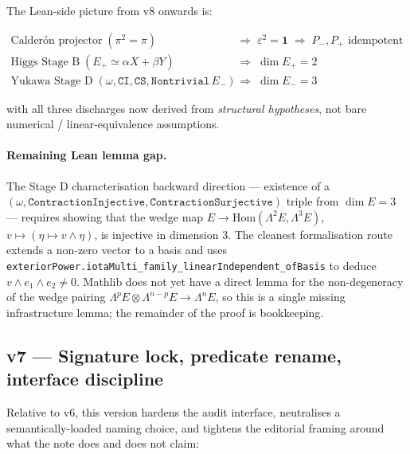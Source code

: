 \documentclass[11pt,a4paper]{article}
\begin{document}
\smallskip
The Lean-side picture from v8 onwards is:

\[
\begin{aligned}
\text{Calder\'on projector}\; (\pi^2 = \pi)
&\;\Rightarrow\; \varepsilon^2 = \mathbf 1 \;\Rightarrow\; P_-, P_+ \text{ idempotent}\\
\text{Higgs Stage B}\; (E_+ \simeq \alpha X + \beta Y)
&\;\Rightarrow\; \dim E_+ = 2\\
\text{Yukawa Stage D}\; (\omega, \texttt{CI}, \texttt{CS}, \texttt{Nontrivial}\,E_-)
&\;\Rightarrow\; \dim E_- = 3
\end{aligned}
\]

with all three discharges now derived from \emph{structural
hypotheses}, not bare numerical / linear-equivalence
assumptions.

\paragraph{Remaining Lean lemma gap.}
The Stage D characterisation backward direction --- existence
of a $(\omega, \texttt{ContractionInjective},
\texttt{ContractionSurjective})$ triple from $\dim E = 3$ ---
requires showing that the wedge map
$E \to \mathrm{Hom}(\Lambda^2 E, \Lambda^3 E)$, $v \mapsto (\eta \mapsto v \wedge \eta)$,
is injective in dimension 3. The cleanest formalisation route
extends a non-zero vector to a basis and uses
\texttt{exteriorPower.iotaMulti\_family\_linearIndependent\_ofBasis}
to deduce $v \wedge e_1 \wedge e_2 \neq 0$. Mathlib does not
yet have a direct lemma for the non-degeneracy of the wedge
pairing $\Lambda^p E \otimes \Lambda^{n-p} E \to \Lambda^n E$,
so this is a single missing infrastructure lemma; the
remainder of the proof is bookkeeping.

\subsection*{v7 --- Signature lock, predicate rename, interface
discipline}

Relative to v6, this version hardens the audit interface,
neutralises a semantically-loaded naming choice, and tightens
the editorial framing around what the note does and does not
claim:
\end{document}
